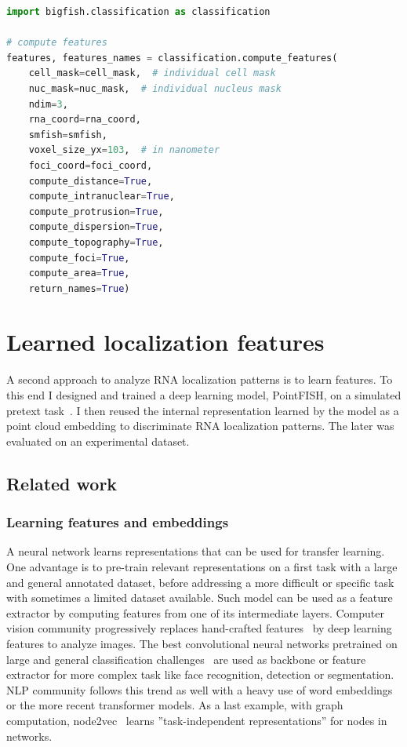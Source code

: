 \begin{minipage}{0.9\textwidth}
\begin{lstlisting}[language=Python]
import bigfish.classification as classification

# compute features
features, features_names = classification.compute_features(
    cell_mask=cell_mask,  # individual cell mask
	nuc_mask=nuc_mask,  # individual nucleus mask
	ndim=3,
	rna_coord=rna_coord,
    smfish=smfish,
	voxel_size_yx=103,  # in nanometer
    foci_coord=foci_coord,
    compute_distance=True,
    compute_intranuclear=True,
    compute_protrusion=True,
    compute_dispersion=True,
    compute_topography=True,
    compute_foci=True,
    compute_area=True,
    return_names=True)
\end{lstlisting}
\end{minipage}

\section{Learned localization features}
\label{sec:learned_features}

A second approach to analyze \ac{RNA} localization patterns is to learn features.
To this end I designed and trained a deep learning model, PointFISH, on a simulated pretext task~\cite{pointfish_2022}.
I then reused the internal representation learned by the model as a point cloud embedding to discriminate \ac{RNA} localization patterns.
The later was evaluated on an experimental dataset.

\subsection{Related work}
\label{subsec:related_work_learned_features}

\subsubsection{Learning features and embeddings}

A neural network learns representations that can be used for transfer learning.
One advantage is to pre-train relevant representations on a first task with a large and general annotated dataset, before addressing a more difficult or specific task with sometimes a limited dataset available.
Such model can be used as a feature extractor by computing features from one of its intermediate layers.
Computer vision community progressively replaces hand-crafted features~\cite{Lowe_1999,Bay_2006} by deep learning features to analyze images.
The best convolutional neural networks pretrained on large and general classification challenges~\cite{He_2016, Szegedy_2016_CVPR, Tan_2019, Huang_2017_CVPR} are used as backbone or feature extractor for more complex task like face recognition, detection or segmentation.
NLP community follows this trend as well with a heavy use of word embeddings~\cite{Mikolov_2013,Joulin_2016} or the more recent transformer models.
As a last example, with graph computation, node2vec~\cite{Grover_2016} learns ''task-independent representations'' for nodes in networks.

